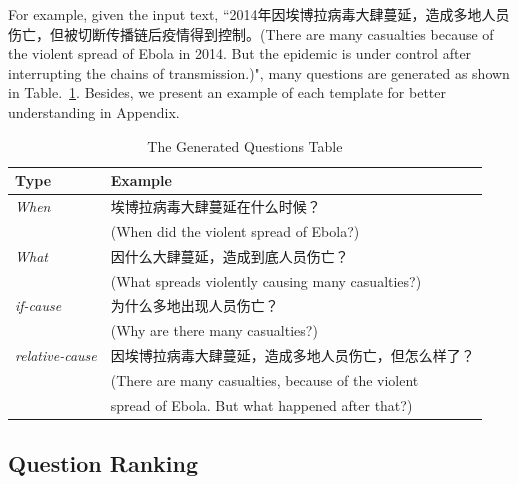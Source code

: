 \documentclass[runningheads,UTF8,article]{comsis2}
\newcommand\revised[1]{{\color{red} #1}}
\begin{document}
		For example, given the input text, ``2014年因埃博拉病毒大肆蔓延，造成多地人员伤亡，但被切断传播链后疫情得到控制。(There are many casualties because of the violent spread of Ebola in 2014. But the epidemic is under control after interrupting the chains of transmission.)", many questions are generated as shown in Table.~\ref{questions}. \revised{Besides, we present an example of each template for better understanding in Appendix.}
		
		
	
	\begin{table}[!th]
		
		\centering
		\caption{The Generated Questions Table }
		\label{questions}
		\setlength\tabcolsep{0.5em}
		
		\begin{tabular}{|p{55pt}|p{250pt}|}
			\hline
			Type  & Example\\
			\hline
			\emph{When} & 埃博拉病毒大肆蔓延在什么时候？\\
			&(When did the violent spread of Ebola?)\\         
			\emph{What} & 因什么大肆蔓延，造成到底人员伤亡？\\
			& (What spreads violently causing many casualties?)\\       
			\emph{if-cause} &  为什么多地出现人员伤亡？\\
			& (Why are there many casualties?)\\
			\emph{relative-cause} & 因埃博拉病毒大肆蔓延，造成多地人员伤亡，但怎么样了？\\
			&(There are many casualties, because of the violent\\
			& spread of Ebola. But what happened after that?)\\
			\hline
			
		\end{tabular}	
		
	\end{table}
	\fi
	
	
	
	
	
	
	\subsection{Question Ranking}
	
\end{document}
